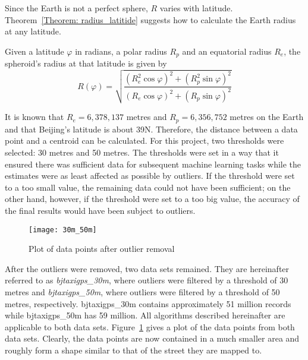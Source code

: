 Since the Earth is not a perfect sphere, $R$ varies with latitude. Theorem~\ref{Theorem: radius_latitide} suggests how to calculate the Earth radius at any latitude. 

\begin{theorem}\label{Theorem: radius_latitide}
Given a latitude $\varphi$ in radians, a polar radius $R_{p}$ and an equatorial radius $R_{e}$, the spheroid's radius at that latitude is given by\cite{EAR17}
\begin{equation}
R(\varphi) = \sqrt{\frac{(R_{e}^2\cos\varphi)^2 + (R_{p}^2\sin\varphi)^2}{(R_{e}\cos\varphi)^2 + (R_{p}\sin\varphi)^2}}
\end{equation}
\end{theorem}

It is known that $R_{e} = 6,378,137$ metres and $R_{p} = 6,356,752$ metres on the Earth\cite{NASA16} and that Beijing's latitude is about 39\textdegree N. Therefore, the distance between a data point and a centroid can be calculated. For this project, two thresholds were selected: 30 metres and 50 metres. The thresholds were set in a way that it ensured there was sufficient data for subsequent machine learning tasks while the estimates were as least affected as possible by outliers. If the threshold were set to a too small value, the remaining data could not have been sufficient; on the other hand, however, if the threshold were set to a too big value, the accuracy of the final results would have been subject to outliers. 

\begin{figure}[h]
\texttt{[image: 30m\_50m]}
\centering
\caption{Plot of data points after outlier removal}\label{Fig:after_removal}
\end{figure}

After the outliers were removed, two data sets remained. They are hereinafter referred to as \emph{bjtaxigps\_30m}, where outliers were filtered by a threshold of 30 metres and \emph{bjtaxigps\_50m}, where outliers were filtered by a threshold of 50 metres, respectively. bjtaxigps\_30m contains approximately 51 million records while bjtaxigps\_50m has 59 million. All algorithms described hereinafter are applicable to both data sets. Figure~\ref{Fig:after_removal} gives a plot of the data points from both data sets. Clearly, the data points are now contained in a much smaller area and roughly form a shape similar to that of the street they are mapped to. 